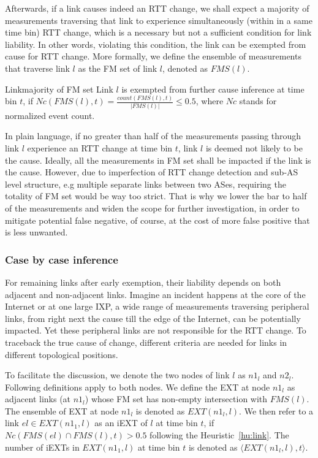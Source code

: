 Afterwards, if a link causes indeed an RTT change, we shall expect a majority of measurements traversing that link to experience simultaneously (within in a same time bin) RTT change, which is a necessary but not a sufficient condition for link liability. In other words, violating this condition, the link can be exempted from cause for RTT change.
More formally, we define the ensemble of measurements that traverse link $l$ as the \acf{FM} set of link $l$, denoted as $FMS(l)$. 

\begin{heuristic}{Link}{majority of \ac{FM} set}\label{hu:link}
Link $l$ is exempted from further cause inference at time bin $t$, if $Nc(FMS(l), t) = \frac{count(FMS(l), t)}{|FMS(l)|} \leq 0.5$, where $Nc$ stands for normalized event count.
\end{heuristic}

In plain language, if no greater than half of the measurements passing through link $l$ experience an RTT change at time bin $t$, link $l$ is deemed not likely to be the cause. 
Ideally, all the measurements in \ac{FM} set shall be impacted if the link is the cause. However, due to imperfection of RTT change detection and sub-AS level structure, e.g multiple separate links between two ASes, requiring the totality of \ac{FM} set would be way too strict. That is why we lower the bar to half of the measurements and widen the scope for further investigation, in order to mitigate potential false negative, of course, at the cost of more false positive that is less unwanted.

\subsubsection{Case by case inference}
For remaining links after early exemption, their liability depends on both adjacent and non-adjacent links. Imagine an incident happens at the core of the Internet or at one large IXP, a wide range of measurements traversing peripheral links, from right next the cause till the edge of the Internet, can be potentially impacted. Yet these peripheral links are not responsible for the RTT change. 
To traceback the true cause of change, different criteria are needed for links in different topological positions.

To facilitate the discussion, we denote the two nodes of link $l$ as $n1_l$ and $n2_l$.
Following definitions apply to both nodes.
We define the \acf{EXT} at node $n1_l$ as adjacent links (at $n1_l$) whose \ac{FM} set has non-empty intersection with $FMS(l)$.
The ensemble of \ac{EXT} at node $n1_l$ is denoted as $EXT(n1_l, l)$.
We then refer to a link $el \in EXT(n1_1, l)$ as an \acf{iEXT} of $l$ at time bin $t$, if $Nc(FMS(el) \cap FMS(l), t) > 0.5$ following the Heuristic~\ref{hu:link}.
The number of \acp{iEXT} in $EXT(n1_1, l)$ at time bin $t$ is denoted as $\langle EXT(n1_l, l), t \rangle$. 



